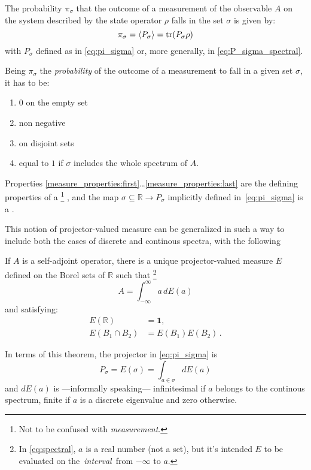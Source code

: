 \begin{proposition}\label{probability_rho}
  The probability $\pi_{\sigma}$
  that the outcome of a measurement of the observable $A$
  on the system described by the state operator $\rho$
  falls in the set $\sigma$
  is given by:
  \begin{equation}\label{eq:probability_rho}
    \pi_{\sigma} = \expval{P_{\sigma}} = \tr(P_{\sigma}\rho)
  \end{equation}
  with $P_{\sigma}$ defined as in \eqref{eq:pi_sigma}
  or, more generally, in \eqref{eq:P_sigma_spectral}.
\end{proposition}

Being $\pi_{\sigma}$ the \emph{probability} of the outcome of a measurement to
fall in a given set $\sigma$, it has to be:
\begin{enumerate}
  \item \label{measure_properties:first} $0$ on the empty set
  \item non negative
  \item \label{measure_properties:last}  on disjoint sets
  \item \label{measure_properties:normalized} equal to $1$ if $\sigma$ includes the whole spectrum of $A$.
\end{enumerate}

Properties \ref{measure_properties:first}\dots\ref{measure_properties:last}
are the defining properties of a \footnote{
  Not to be confused with \emph{measurement}.
} \parencite{EncMath_Measure},
and
the map $\sigma \subseteq \mathbb{R} \rightarrow P_{\sigma}$
implicitly defined in~\eqref{eq:pi_sigma} is a .

This notion of projector-valued measure can be generalized
in such a way to include both the cases of discrete and continous spectra,
with the following \parencite{VonNeumann, Ballentine}
\begin{theorem}
  If $A$ is a self-adjoint operator,
  there is a unique projector-valued measure $E$
  defined on the Borel sets of $\mathbb{R}$
  such that
  \footnote{
    In \eqref{eq:spectral}, $a$ is a real number (not a set),
    but it's intended $E$ to be evaluated
    on the~\emph{interval}~from $-\infty$ to $a$.
  }
  \begin{equation}\label{eq:spectral}
    A=\int_{-\infty}^{\infty}a\, dE(a)
  \end{equation}
  and satisfying:
  \begin{align*}
    E(\mathbb{R})       & =\mathbf{1},\\
    E(B_{1}\cap B_{2}) & =E(B_{1})E(B_{2})\,.
  \end{align*}
\end{theorem}

In terms of this theorem, the projector in \eqref{eq:pi_sigma} is
\begin{equation}\label{eq:P_sigma_spectral}
  P_{\sigma} = E(\sigma) = \int_{a\in\sigma}dE(a)
\end{equation}
and $dE(a)$ is
---informally speaking---
infinitesimal if $a$ belongs to the continous spectrum,
finite if $a$ is a discrete eigenvalue
and zero otherwise.
